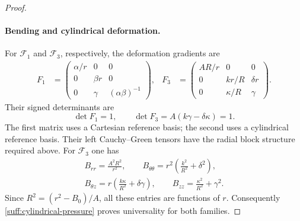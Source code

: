 \documentclass[11pt,a4paper]{article}
\numberwithin{equation}{section}
\theoremstyle{plain}
\theoremstyle{definition}
\theoremstyle{remark}
\begin{document}
\begin{proof}
\paragraph{Bending and cylindrical deformation.}
For $\mathcal F_1$ and $\mathcal F_3$, respectively, the deformation
gradients are
\begin{equation}\label{suff:cylindrical-gradients}
 \begin{aligned}
 F_1&=
 \begin{pmatrix}
 \alpha/r&0&0\\
 0&\beta r&0\\
 0&\gamma&(\alpha\beta)^{-1}
 \end{pmatrix},&
 F_3&=
 \begin{pmatrix}
 AR/r&0&0\\
 0&kr/R&\delta r\\
 0&\kappa/R&\gamma
 \end{pmatrix}.
 \end{aligned}
\end{equation}
Their signed determinants are
\begin{equation}\label{suff:cylindrical-jacobians}
 \det F_1=1,\qquad
 \det F_3=A(k\gamma-\delta\kappa)=1.
\end{equation}
The first matrix uses a Cartesian reference basis; the second uses a
cylindrical reference basis.  Their left Cauchy--Green tensors have the
radial block structure required above.  For $\mathcal F_3$ one has
\begin{equation}\label{suff:full-cylindrical-block}
 \begin{gathered}
 B_{rr}=\frac{A^2R^2}{r^2},\qquad
 B_{\theta\theta}=r^2\left(\frac{k^2}{R^2}+\delta^2\right),\\
 B_{\theta z}=r\left(\frac{k\kappa}{R^2}+\delta\gamma\right),\qquad
 B_{zz}=\frac{\kappa^2}{R^2}+\gamma^2 .
 \end{gathered}
\end{equation}
Since $R^2=(r^2-B_0)/A$, all these entries are functions of $r$.
Consequently \eqref{suff:cylindrical-pressure} proves universality for
both families.


\end{proof}
\end{document}
